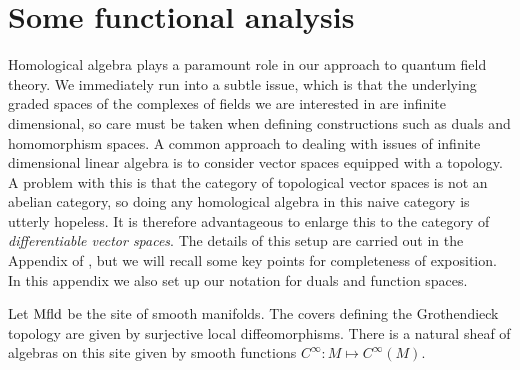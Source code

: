 \documentclass[11pt]{amsart}
\begin{document}





\appendix

\section{Some functional analysis}

Homological algebra plays a paramount role in our approach to quantum field theory.
We immediately run into a subtle issue, which is that the underlying graded spaces of the complexes of fields we are interested in are infinite dimensional, so care must be taken when defining constructions such as duals and homomorphism spaces. 
A common approach to dealing with issues of infinite dimensional linear algebra is to consider vector spaces equipped with a topology. 
A problem with this is that the category of topological vector spaces is not an abelian category, so doing any homological algebra in this naive category is utterly hopeless. 
It is therefore advantageous to enlarge this to the category of {\em differentiable vector spaces}.
The details of this setup are carried out in the Appendix of \cite{CG1}, but we will recall some key points for completeness of exposition.
In this appendix we also set up our notation for duals and function spaces. 

Let ${\rm Mfld}$ be the site of smooth manifolds.
The covers defining the Grothendieck topology are given by surjective local diffeomorphisms.
There is a natural sheaf of algebras on this site given by smooth functions $C^\infty : M \mapsto C^\infty(M)$. 
\end{document}
